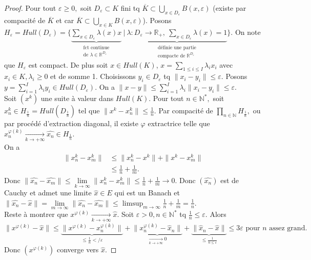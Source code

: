 \begin{proof}
    Pour tout $\varepsilon \ge 0,$ soit $D_\varepsilon \subset K$ fini tq $\overline{K}\subset \bigcup\limits_{x\in D_\varepsilon } B(x,\varepsilon )$ (existe par compacité de $\overline{K}$ et car $\overline{K}\subset \bigcup\limits_{x\in K} B(x,\varepsilon )$). Posons $H_\varepsilon =Hull(D_\varepsilon )=\{\underbrace{\sum\limits_{x\in D_\varepsilon }^{} \lambda(x)x}_{\substack{\text{fct continue}\\\text{de }\lambda\in \mathbb{R} ^{D_\varepsilon }}}\ |\ \underbrace{\lambda:D_\varepsilon \to \mathbb{R} _+,\ \sum\limits_{x\in D_\varepsilon }^{} \lambda(x)=1}_{\substack{\text{définie une partie}\\\text{compacte de }\mathbb{R} ^{D_\varepsilon }}}\} $. On note que $H_\varepsilon $ est compact. De plus soit $x\in Hull(K)$, $x=\sum\limits_{1\le i\le I}^{} \lambda_ix_i$ avec $x_i\in K, \lambda_i\ge 0$ et de somme 1. Choisissons $y_i\in D_\varepsilon $ tq $\|x_i-y_i\|\le \varepsilon .$ Posons $y=\sum\limits_{i=1}^{I} \lambda_iy_i\in Hull(D_\varepsilon ).$ On a $\|x-y\|\le \sum\limits_{i=1}^{I} \lambda_i\|x_i-y_i\|\le \varepsilon .$ \\
    Soit $(x^k)$ une suite à valeur dans $Hull(K).$ Pour tout $n\in \mathbb{N} ^*,$ soit $x_n^k\in H_{\frac{1}{n}}=Hull(D_{\frac{1}{n}})$ tel que $\|x^k-x^k_n\|\le \frac{1}{n}.$ Par compacité de $\prod\limits_{n\in \mathbb{N} }^{} H_{\frac{1}{n}},$ ou par procédé d'extraction diagonal, il existe $\varphi $ extractrice telle que $x_n^{\varphi (k)}\underset{k\to +\infty}{\longrightarrow} \hat{x_n}\in H_{\frac{1}{n}}.$ \\
    On a
    \begin{align*}
        \|x_n^k-x_m^k\|&\le \|x_n^k-x^k\|+\|x^k-x_m^k\|\\
                       &\le \frac{1}{n}+\frac{1}{m}.
    \end{align*}
    Donc $\|\hat{x_n}-\hat{x_m}\|\le \lim\limits_{k \to \infty} \|x_n^k-x_m^k\|\le \frac{1}{n}+\frac{1}{m} \to 0$. Donc $(\hat{x_n})$ est de Cauchy et admet une limite $\hat{x}\in E$ qui est un Banach et $\|\hat{x_n}-\hat{x}\|=\lim\limits_{m \to \infty} \|\hat{x_n}-\hat{x_m}\|\le \limsup_{m\to \infty }\frac{1}{n}+\frac{1}{m}=\frac{1}{n}.$\\
    Reste à montrer que $x^{\varphi (k)}\underset{k\to +\infty}{\longrightarrow} \hat{x}.$ Soit $\varepsilon >0, n\in \mathbb{N} ^*$ tq $\frac{1}{n}\le \varepsilon .$ Alors $\|x^{\varphi (k)}-\hat{x}\|\le \underbrace{\|x^{\varphi (k)}-x^{\varphi (k)}_n\|}_{\le \frac{1}{n}</\varepsilon } + \underbrace{\|x^{\varphi (k)}_n-\hat{x}_n\|}_{\underset{k\to +\infty}{\longrightarrow} 0} + \underbrace{\|\hat{x}_n-\hat{x}\|}_{\le \frac{1}{n\le \varepsilon }}\le 3\varepsilon \text{ pour $n$ assez grand.}$
    Donc $(x^{\varphi (k)})$ converge vers $\hat{x}.$
\end{proof}
